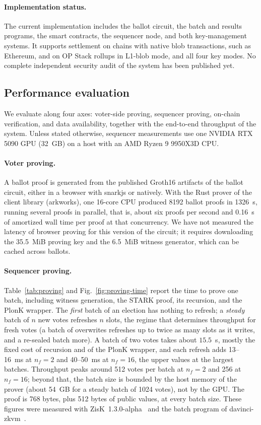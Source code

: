 \paragraph{Implementation status.} The current implementation includes the ballot circuit, the batch and results programs, the smart contracts, the sequencer node, and both key-management systems. It supports settlement on chains with native blob transactions, such as Ethereum, and on OP Stack rollups in L1-blob mode, and all four key modes. No complete independent security audit of the system has been published yet.

\subsection{Performance evaluation}
\label{sec:analysis:performance-evaluation}

We evaluate \davinci along four axes: voter-side proving, sequencer proving, on-chain verification, and data availability, together with the end-to-end throughput of the system. Unless stated otherwise, sequencer measurements use one NVIDIA RTX 5090 GPU (32~GB) on a host with an AMD Ryzen 9 9950X3D CPU.

\paragraph{Voter proving.} A ballot proof is generated from the published Groth16 artifacts of the ballot circuit, either in a browser with snarkjs or natively. With the Rust prover of the client library (arkworks), one 16-core CPU produced 8192 ballot proofs in 1326~s, running several proofs in parallel, that is, about six proofs per second and 0.16~s of amortized wall time per proof at that concurrency. We have not measured the latency of browser proving for this version of the circuit; it requires downloading the 35.5~MiB proving key and the 6.5~MiB witness generator, which can be cached across ballots.

\paragraph{Sequencer proving.} Table~\ref{tab:proving} and Fig.~\ref{fig:proving-time} report the time to prove one batch, including witness generation, the \ac{STARK} proof, its recursion, and the PlonK wrapper. The \emph{first} batch of an election has nothing to refresh; a \emph{steady} batch of $n$ new votes refreshes $n$ slots, the regime that determines throughput for fresh votes (a batch of overwrites refreshes up to twice as many slots as it writes, and a re-sealed batch more). A batch of two votes takes about $15.5$~s, mostly the fixed cost of recursion and of the PlonK wrapper, and each refresh adds 13--16~ms at $n_f = 2$ and 40--50~ms at $n_f = 16$, the upper values at the largest batches. Throughput peaks around 512 votes per batch at $n_f = 2$ and 256 at $n_f = 16$; beyond that, the batch size is bounded by the host memory of the prover (about 54~GB for a steady batch of 1024 votes), not by the GPU. The proof is 768 bytes, plus 512 bytes of public values, at every batch size. These figures were measured with ZisK~1.3.0-alpha~\cite{zisk} and the batch program of davinci-zkvm~\cite{davinci-zkvm}.


